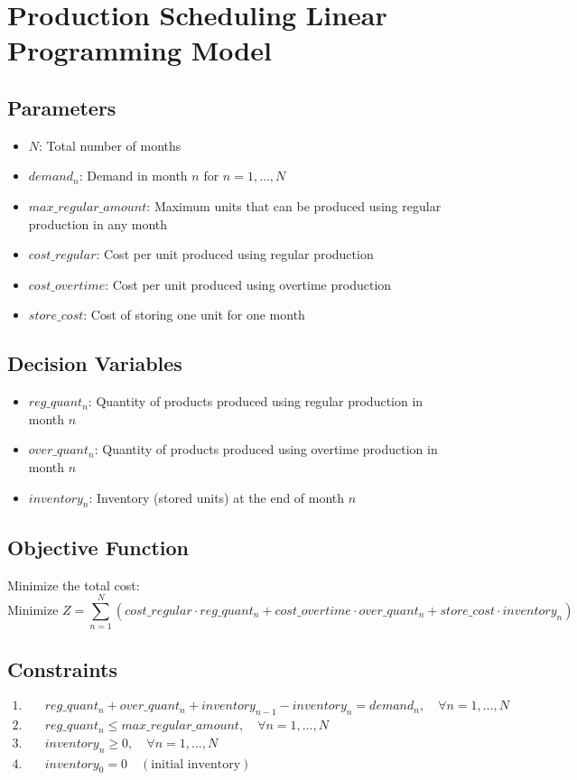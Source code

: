 \documentclass{article}
\begin{document}
\section*{Production Scheduling Linear Programming Model}

\subsection*{Parameters}
\begin{itemize}
    \item $N$: Total number of months
    \item $demand_n$: Demand in month $n$ for $n = 1, \ldots, N$
    \item $max\_regular\_amount$: Maximum units that can be produced using regular production in any month
    \item $cost\_regular$: Cost per unit produced using regular production
    \item $cost\_overtime$: Cost per unit produced using overtime production
    \item $store\_cost$: Cost of storing one unit for one month
\end{itemize}

\subsection*{Decision Variables}
\begin{itemize}
    \item $reg\_quant_n$: Quantity of products produced using regular production in month $n$
    \item $over\_quant_n$: Quantity of products produced using overtime production in month $n$
    \item $inventory_n$: Inventory (stored units) at the end of month $n$
\end{itemize}

\subsection*{Objective Function}
Minimize the total cost:
\[
\text{Minimize } Z = \sum_{n=1}^{N} \left( cost\_regular \cdot reg\_quant_n + cost\_overtime \cdot over\_quant_n + store\_cost \cdot inventory_n \right)
\]

\subsection*{Constraints}
\begin{align*}
1. & \quad reg\_quant_n + over\_quant_n + inventory_{n-1} - inventory_n = demand_n, \quad \forall n = 1, \ldots, N \\
2. & \quad reg\_quant_n \leq max\_regular\_amount, \quad \forall n = 1, \ldots, N \\
3. & \quad inventory_n \geq 0, \quad \forall n = 1, \ldots, N \\
4. & \quad inventory_0 = 0 \quad (\text{initial inventory}) \\
\end{align*}
\end{document}
